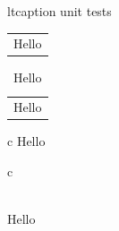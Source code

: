 \documentclass{article}
\begin{document}
ltcaption unit tests


\begin{longtable}{c}
Hello\\
\end{longtable}


\begin{longtable}{c}
\caption{Hello}\\
Hello\\
\end{longtable}


\begin{longtable*}{c}
Hello\\
\end{longtable*}


\begin{longtable*}{c}
\caption*{Hello}\\
Hello\\
\end{longtable*}

\end{document}
